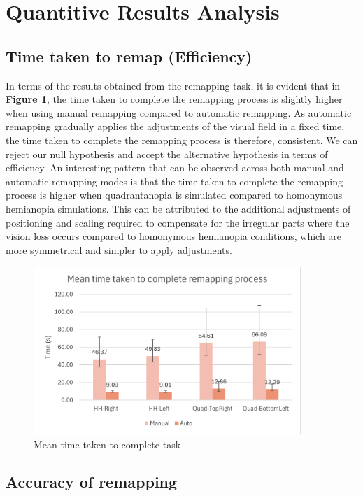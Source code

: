 \documentclass{l4proj}
\begin{document}
\section{Quantitive Results Analysis}
\subsection{Time taken to remap (Efficiency)}
In terms of the results obtained from the remapping task, it is evident that in \textbf{Figure \ref{fig:meanTimeTaken}}, the time taken to complete the remapping process is slightly higher when using manual remapping compared to automatic remapping. As automatic remapping gradually applies the adjustments of the visual field in a fixed time, the time taken to complete the remapping process is therefore, consistent. We can reject our null hypothesis and accept the alternative hypothesis in terms of efficiency. An interesting pattern that can be observed across both manual and automatic remapping modes is that the time taken to complete the remapping process is higher when quadrantanopia is simulated compared to homonymous hemianopia simulations. This can be attributed to the additional adjustments of positioning and scaling required to compensate for the irregular parts where the vision loss occurs compared to homonymous hemianopia conditions, which are more symmetrical and simpler to apply adjustments.


\begin{figure}[!h]
    \centering
    \includegraphics[width=0.9\textwidth]{images/meanTimeTaken_altcolour.png}
    \caption{Mean time taken to complete task}
    \label{fig:meanTimeTaken}
\end{figure}


\subsection{Accuracy of remapping}
\end{document}
